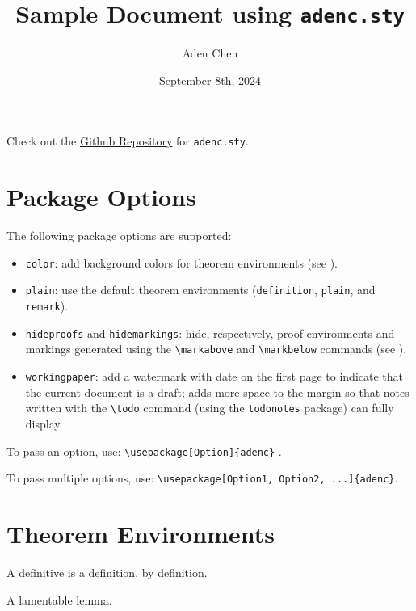 \documentclass[10pt,letterpaper]{amsart}
\title{Sample Document using \texttt{adenc.sty}}
\author{Aden Chen}
\date{September 8th, 2024}
\begin{document}
\maketitle

\tableofcontents

\begin{mdframed}
Check out the \href{https://github.com/AdenChen27/latex}{Github Repository} for \texttt{adenc.sty}. 
\end{mdframed}


\section{Package Options}
The following package options are supported:
\begin{itemize}
  \item \verb|color|: add background colors for theorem environments (see ). 
  \item \verb|plain|: use the default theorem environments (\texttt{definition}, \texttt{plain}, and \texttt{remark}).
  \item \verb|hideproofs| and \verb|hidemarkings|: hide, respectively, proof environments and markings generated using the \verb|\markabove| and \verb|\markbelow| commands (see ). 
  \item \verb|workingpaper|: add a watermark with date on the first page to indicate that the current document is a draft; adds more space to the margin so that notes written with the \verb|\todo| command (using the \verb|todonotes| package) can fully display. 
\end{itemize}

To pass an option, use: \verb|\usepackage[Option]{adenc}| . 

To pass multiple options, use: \verb|\usepackage[Option1, Option2, ...]{adenc}|. 


\section{Theorem Environments}
\label{sec:thm-env}

\begin{definition}
  A definitive  is a definition, by definition. 
\end{definition}

\begin{lemma}
  A lamentable lemma. 
\end{lemma}
\end{document}
